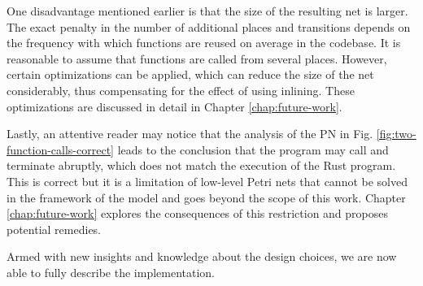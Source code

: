 \documentclass[../Thesis.tex]{subfiles}
\begin{document}
One disadvantage mentioned earlier is that the size of the resulting net is larger.
The exact penalty in the number of additional places and transitions depends
on the frequency with which functions are reused on average in the codebase.
It is reasonable to assume that functions are called from several places.
However, certain optimizations can be applied,
which can reduce the size of the net considerably,
thus compensating for the effect of using inlining.
These optimizations are discussed in detail in Chapter \ref{chap:future-work}.

Lastly, an attentive reader may notice that
the analysis of the \acrshort{PN} in Fig. \ref{fig:two-function-calls-correct}
leads to the conclusion that
the program may call  and terminate abruptly,
which does not match the execution of the Rust program.
This is correct but it is a limitation of low-level Petri nets
that cannot be solved in the framework of the model and
goes beyond the scope of this work.
Chapter \ref{chap:future-work} explores
the consequences of this restriction and proposes potential remedies.

Armed with new insights and knowledge about the design choices,
we are now able to fully describe the implementation.
\end{document}
